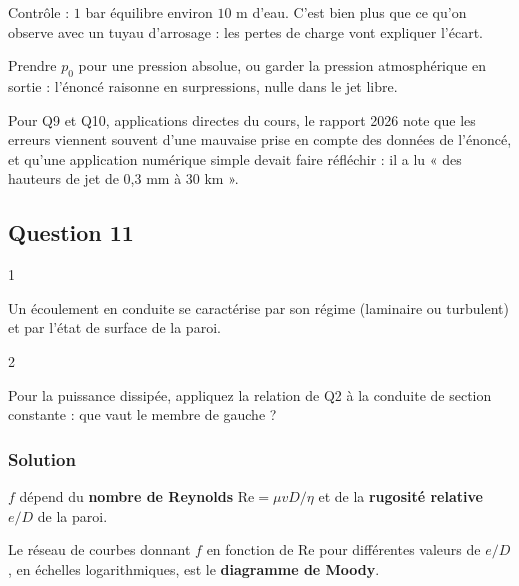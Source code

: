 \documentclass[11pt,a4paper]{article}
\begin{document}
Contrôle : \(1\) bar équilibre environ \(10\) m d'eau. C'est bien plus que ce qu'on observe avec un tuyau d'arrosage : les pertes de charge vont expliquer l'écart.

\begin{piege}

Prendre \(p_0\) pour une pression absolue, ou garder la pression atmosphérique en sortie : l'énoncé raisonne en surpressions, nulle dans le jet libre.

\end{piege}

\begin{jury}

Pour Q9 et Q10, applications directes du cours, le rapport 2026 note que les erreurs viennent souvent d'une mauvaise prise en compte des données de l'énoncé, et qu'une application numérique simple devait faire réfléchir : il a lu « des hauteurs de jet de 0,3 mm à 30 km ».

\end{jury}

\hypertarget{question-11}{%
\subsection{Question 11}\label{question-11}}

\begin{indication}{1}

Un écoulement en conduite se caractérise par son régime (laminaire ou turbulent) et par l'état de surface de la paroi.

\end{indication}

\begin{indication}{2}

Pour la puissance dissipée, appliquez la relation de Q2 à la conduite de section constante : que vaut le membre de gauche ?

\end{indication}

\hypertarget{solution-10}{%
\subsubsection{Solution}\label{solution-10}}

\(f\) dépend du \textbf{nombre de Reynolds} \(\mathrm{Re}=\mu vD/\eta\) et de la \textbf{rugosité relative} \(e/D\) de la paroi.

Le réseau de courbes donnant \(f\) en fonction de \(\mathrm{Re}\) pour différentes valeurs de \(e/D\), en échelles logarithmiques, est le \textbf{diagramme de Moody}.
\end{document}
